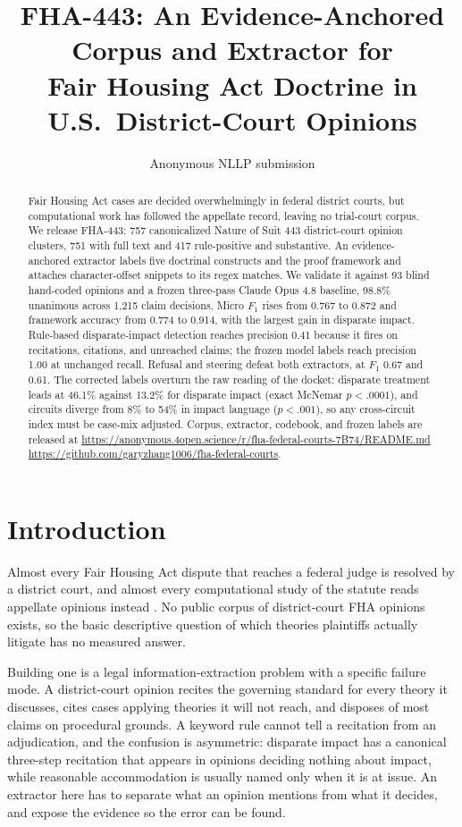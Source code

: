 \documentclass[11pt]{article}
\title{FHA-443: An Evidence-Anchored Corpus and Extractor for \\ Fair Housing Act Doctrine in U.S.\ District-Court Opinions}
\author{Anonymous NLLP submission}
\makeatletter
\newcommand{\repowhere}{\ifacl@anonymize
\url{https://anonymous.4open.science/r/fha-federal-courts-7B74/README.md}\else
\url{https://github.com/garyzhang1006/fha-federal-courts}\fi}
\makeatother
\begin{document}
\maketitle

\begin{abstract}
Fair Housing Act cases are decided overwhelmingly in federal district courts, but computational work has followed the appellate record, leaving no trial-court corpus. We release FHA-443: 757 canonicalized Nature of Suit 443 district-court opinion clusters, 751 with full text and 417 rule-positive and substantive. An evidence-anchored extractor labels five doctrinal constructs and the proof framework and attaches character-offset snippets to its regex matches. We validate it against 93 blind hand-coded opinions and a frozen three-pass Claude Opus 4.8 baseline, 98.8\% unanimous across 1,215 claim decisions. Micro $F_1$ rises from 0.767 to 0.872 and framework accuracy from 0.774 to 0.914, with the largest gain in disparate impact. Rule-based disparate-impact detection reaches precision 0.41 because it fires on recitations, citations, and unreached claims; the frozen model labels reach precision 1.00 at unchanged recall. Refusal and steering defeat both extractors, at $F_1$ 0.67 and 0.61. The corrected labels overturn the raw reading of the docket: disparate treatment leads at 46.1\% against 13.2\% for disparate impact (exact McNemar $p<.0001$), and circuits diverge from 8\% to 54\% in impact language ($p<.001$), so any cross-circuit index must be case-mix adjusted. Corpus, extractor, codebook, and frozen labels are released at \repowhere.
\end{abstract}

\section{Introduction}

Almost every Fair Housing Act dispute that reaches a federal judge is resolved by a district court, and almost every computational study of the statute reads appellate opinions instead \citep{seicshnaydre2013}. No public corpus of district-court FHA opinions exists, so the basic descriptive question of which theories plaintiffs actually litigate has no measured answer.

Building one is a legal information-extraction problem with a specific failure mode. A district-court opinion recites the governing standard for every theory it discusses, cites cases applying theories it will not reach, and disposes of most claims on procedural grounds. A keyword rule cannot tell a recitation from an adjudication, and the confusion is asymmetric: disparate impact has a canonical three-step recitation that appears in opinions deciding nothing about impact, while reasonable accommodation is usually named only when it is at issue. An extractor here has to separate what an opinion mentions from what it decides, and expose the evidence so the error can be found.
\end{document}
